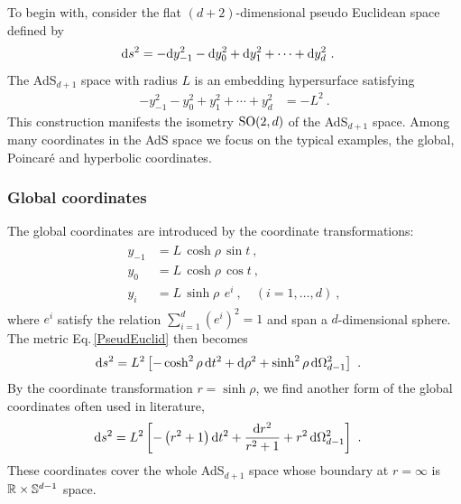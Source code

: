 To begin with, consider the flat $(d+2)$-dimensional pseudo Euclidean space defined by
\begin{align}\label{PseudEuclid}
 \mathrm{d} s^2&= - \mathrm{d} y_{-1}^2 - \mathrm{d} y_0^2 + \mathrm{d} y_1^2 + \cdots + \mathrm{d} y_d^2 \ .
\end{align}
The AdS$_{d+1}$ space with radius $L$ is an embedding hypersurface
satisfying 
\begin{align}
 -y_{-1}^2 - y_0^2 + y_1^2 + \cdots + y_d^2&= -L^2 \ .
\end{align}
This construction manifests the isometry $\mathrm{SO}(2,d)$ of the AdS$_{d+1}$ space.
Among many coordinates in the AdS space we focus on the typical examples,
the global, Poincar{\'e} and hyperbolic coordinates.


\subsubsection{Global coordinates}
The global coordinates are introduced by the coordinate transformations:
\begin{align}
\begin{aligned}
 y_{-1}&= L\,\cosh\rho\, \sin t \ , \\
 y_0&=L\,\cosh\rho\,\cos t \ , \\
 y_i &= L\,\sinh \rho\, \ e^i \ , \quad (i=1,\dots,d)\ ,
\end{aligned}
\end{align}
where $e^i$ satisfy the relation $\sum_{i=1}^d (e^i)^2=1$ and 
span a $d$-dimensional sphere.
The metric Eq.\,\eqref{PseudEuclid} then becomes
\begin{align}
 \mathrm{d} s^2&= L^2\left[ -\cosh^2\rho\, \mathrm{d} t^2 + \mathrm{d}\rho^2 + \sinh^2\rho\,
 \mathrm{d}\Omega_{d-1}^2 \right] \ .
\end{align}
By the coordinate transformation $r = \sinh\rho$, we find
another form of the global coordinates often used in literature,
\begin{align}\label{GlobalAdS}
 \mathrm{d} s^2&= L^2\left[ -\left( r^2+1\right) \mathrm{d} t^2 + \frac{\mathrm{d} r^2}{r^2 + 1
 } + r^2 \,\mathrm{d}\Omega_{d-1}^2 \right]\ .
\end{align}
These coordinates cover the whole AdS$_{d+1}$ space whose boundary at $r=\infty$ is $\mathbb{R} \times \mathbb{S}^{d-1}$ space.

